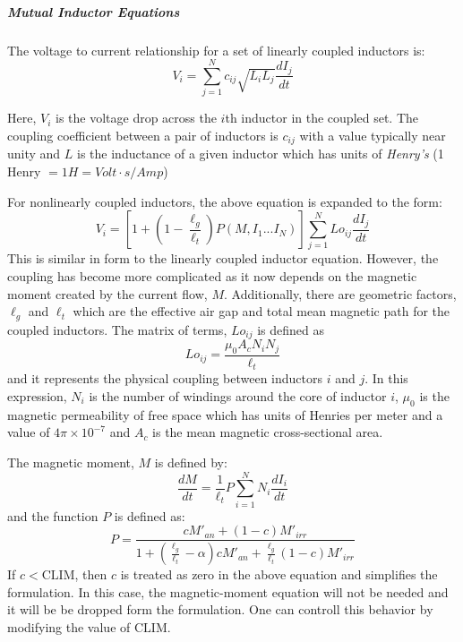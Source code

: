 \subparagraph{Mutual Inductor Equations}

The voltage to current relationship for a set of linearly coupled inductors is:
\begin{equation}
V_{i} = \sum_{j=1}^{N} c_{ij} \sqrt{ L_{i} L_{j} } \frac{dI_{j}}{dt}
\label{linMIRelation}
\end{equation}

Here, $V_{i}$ is the voltage drop across the $i$th inductor in the coupled set.
The coupling coefficient between a pair of inductors is $c_{ij}$ with a value typically
near unity and $L$ is the inductance of a given inductor which has units of
\emph{Henry's} (1 Henry $ = 1 H = Volt \cdot s / Amp $)

For nonlinearly coupled inductors, the above equation is expanded to the form:
\begin{equation}
V_{i} = \left[1 + \left(1-\frac{\ell_g}{\ell_t}\right)P(M,I_{1} ... I_{N})\right]\sum_{j=1}^{N} Lo_{ij} \frac{dI_{j}}{dt}
\label{nonlinMIRelation}
\end{equation}
This is similar in form to the linearly coupled inductor equation.  However,
the coupling has become more complicated as it now depends on the magnetic moment
created by the current flow, $M$.  Additionally, there are geometric factors,
$\ell_{g}$ and $\ell_{t}$ which are the effective air gap and total mean magnetic
path for the coupled inductors. The matrix of terms, $Lo_{ij}$ is defined as
\begin{equation}
Lo_{ij}=\frac{\mu_0 A_c N_i N_j}{\ell_t}
\end{equation}
and it represents the physical coupling between inductors $i$ and $j$.  In this
expression, $N_i$ is the number of windings around the core of inductor $i$,
$\mu_0$ is the magnetic permeability of free space which has units of Henries per meter
and a value of $4\pi \times 10^{-7}$ and $A_c$ is the mean magnetic cross-sectional area.

The magnetic moment, $M$ is defined by:
\begin{equation}
\frac{dM}{dt} = \frac{1}{\ell_t} P \sum_{i=1}^{N} N_i \frac{dI_i}{dt}
\end{equation}
and the function $P$ is defined as:
\begin{equation}
P = \frac{c M'_{an} + (1-c)M'_{irr}}{1 + \left(\frac{\ell_g}{\ell_t}-\alpha\right) c M'_{an} + \frac{\ell_g}{\ell_t}(1-c)M'_{irr}}
\end{equation}
If $c < \mbox{CLIM}$, then $c$ is treated as zero in the above equation and \Xyce\/ 
simplifies the formulation.  In this case, the magnetic-moment equation will not be 
needed and it will be be dropped form the formulation.  One can controll this behavior by
modifying the value of $\mbox{CLIM}$.

